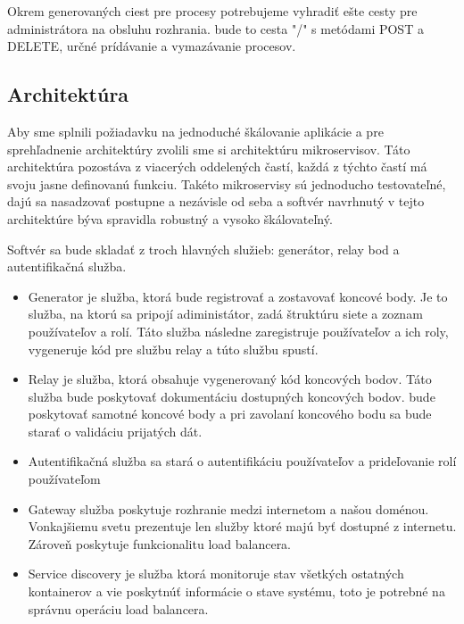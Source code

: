 Okrem generovaných ciest pre procesy potrebujeme vyhradiť ešte cesty pre administrátora na obsluhu rozhrania. bude to cesta "/" s metódami POST a DELETE, určné prídávanie a vymazávanie procesov.



\subsection{Architektúra}  
Aby sme splnili požiadavku na jednoduché škálovanie aplikácie a pre sprehľadnenie architektúry zvolili sme si architektúru mikroservisov. Táto architektúra pozostáva z viacerých oddelených častí, každá z týchto častí má svoju jasne definovanú funkciu. Takéto mikroservisy sú jednoducho testovateľné, dajú sa nasadzovať postupne a nezávisle od seba a softvér navrhnutý v tejto architektúre býva spravidla robustný a vysoko škálovateľný.   

Softvér sa bude skladať z troch hlavných služieb: generátor, relay bod a autentifikačná služba. 

\begin{itemize} 
	\item Generator je služba, ktorá bude registrovať a zostavovať koncové body. Je to služba, na ktorú sa pripojí adiministátor, zadá štruktúru siete a zoznam používateľov a rolí. Táto služba následne zaregistruje používateľov a ich roly, vygeneruje kód pre službu relay a túto službu spustí. 
	
	\item Relay je služba, ktorá obsahuje vygenerovaný kód koncových bodov. Táto služba bude poskytovať dokumentáciu dostupných koncových bodov. bude poskytovať samotné koncové body a pri zavolaní koncového bodu sa bude starať o validáciu prijatých dát. 
	
	\item Autentifikačná služba sa stará o autentifikáciu používateľov a prideľovanie rolí používateľom 
	
	\item Gateway služba poskytuje rozhranie medzi internetom a našou doménou. Vonkajšiemu svetu prezentuje len služby ktoré majú byť dostupné z internetu. Zároveň poskytuje funkcionalitu load balancera.  
	
	\item Service discovery je služba ktorá monitoruje stav všetkých ostatných kontainerov a vie poskytnúť informácie o stave systému, toto je potrebné na správnu operáciu load balancera.
	
\end{itemize} 

